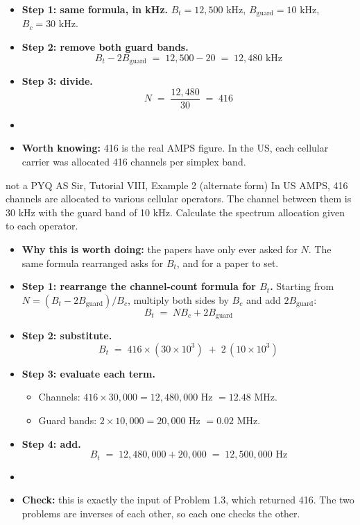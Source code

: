 \begin{itemize}
  \item \textbf{Step 1: same formula, in kHz.}
        $B_t = 12{,}500$ kHz, \; $B_{\text{guard}} = 10$ kHz, \; $B_c = 30$ kHz.
  \item \textbf{Step 2: remove both guard bands.}
        \[ B_t - 2B_{\text{guard}} \;=\; 12{,}500 - 20 \;=\; 12{,}480 \text{ kHz} \]
  \item \textbf{Step 3: divide.}
        \[ N \;=\; \frac{12{,}480}{30} \;=\; 416 \]
  \item {}
  \item \textbf{Worth knowing:} 416 is the real AMPS figure. In the US, each cellular carrier
        was allocated 416 channels per simplex band. 
\end{itemize}

\begin{asked}[PROBLEM]{not a PYQ \textperiodcentered{} AS Sir, Tutorial VIII, Example 2 (alternate form)}
In US AMPS, 416 channels are allocated to various cellular operators. The channel between them
is 30 kHz with the guard band of 10 kHz. Calculate the spectrum allocation given to each
operator.
\end{asked}

\begin{itemize}
  \item \textbf{Why this is worth doing:} the papers have only ever asked for $N$. The same
        formula rearranged asks for $B_t$, and  for a paper
        to set.
  \item \textbf{Step 1: rearrange the channel-count formula for $B_t$.} Starting from
        $N = (B_t - 2B_{\text{guard}})/B_c$, multiply both sides by $B_c$ and add
        $2B_{\text{guard}}$:
        \[ B_t \;=\; N B_c + 2 B_{\text{guard}} \]
  \item \textbf{Step 2: substitute.}
        \[ B_t \;=\; 416 \times (30 \times 10^3) \;+\; 2\,(10 \times 10^3) \]
  \item \textbf{Step 3: evaluate each term.}
  \begin{itemize}
    \item Channels: $416 \times 30{,}000 = 12{,}480{,}000$ Hz $= 12.48$ MHz.
    \item Guard bands: $2 \times 10{,}000 = 20{,}000$ Hz $= 0.02$ MHz.
  \end{itemize}
  \item \textbf{Step 4: add.}
        \[ B_t \;=\; 12{,}480{,}000 + 20{,}000 \;=\; 12{,}500{,}000 \text{ Hz} \]
  \item {}
  \item \textbf{Check:} this is exactly the input of Problem 1.3, which returned 416. The two
        problems are inverses of each other, so each one checks the other.
\end{itemize}

